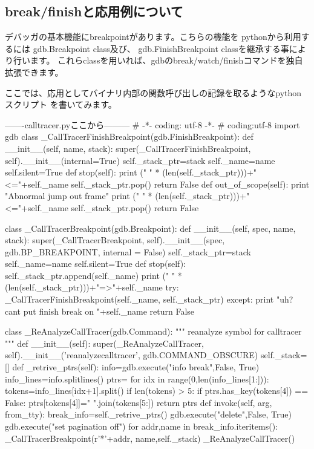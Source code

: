 \documentclass[mingoth,a4paper]{jsarticle}
\begin{document}
\subsection{break/finishと応用例について}

 デバッガの基本機能にbreakpointがあります。こちらの機能を
pythonから利用するには gdb.Breakpoint class及び、
gdb.FinishBreakpoint classを継承する事により行います。
これらclassを用いれば、gdbのbreak/watch/finishコマンドを独自拡張できます。

 ここでは、応用としてバイナリ内部の関数呼び出しの記録を取るようなpythonスクリプト
を書いてみます。

\begin{commandline}
-------calltracer.pyここから---------
# -*- coding: utf-8 -*-
# coding:utf-8
import gdb
class _CallTracerFinishBreakpoint(gdb.FinishBreakpoint):
	def __init__(self, name, stack):
		super(_CallTracerFinishBreakpoint, self).__init__(internal=True)
		self._stack_ptr=stack
		self._name=name
		self.silent=True
	def stop(self):
		print (" " * (len(self._stack_ptr)))+"<="+self._name
		self._stack_ptr.pop()
		return False
	def out_of_scope(self):
		print "Abnormal jump out frame"
		print (" " * (len(self._stack_ptr)))+"<="+self._name
		self._stack_ptr.pop()
		return False

class _CallTracerBreakpoint(gdb.Breakpoint):
	def __init__(self, spec, name, stack):
		super(_CallTracerBreakpoint, self).__init__(spec, 
							    gdb.BP_BREAKPOINT,
							    internal = False)
		self._stack_ptr=stack
		self._name=name
		self.silent=True
	def stop(self):
		self._stack_ptr.append(self._name)
		print (" " * (len(self._stack_ptr)))+"=>"+self._name
		try:
			_CallTracerFinishBreakpoint(self._name, self._stack_ptr)
		except:
			print "uh? cant put finish break on "+self._name
		return False

class _ReAnalyzeCallTracer(gdb.Command):
	""" reanalyze symbol for calltracer """
	def __init__(self):
		super(_ReAnalyzeCallTracer, self).__init__('reanalyzecalltracer',
							gdb.COMMAND_OBSCURE)
		self._stack=[]
	def _retrive_ptrs(self):
		info=gdb.execute("info break",False, True)
		info_lines=info.splitlines()
		ptrs={}
		for idx in range(0,len(info_lines[1:])):
			tokens=info_lines[idx+1].split()
			if len(tokens) > 5:
				if ptrs.has_key(tokens[4]) == False:
					ptrs[tokens[4]]=" ".join(tokens[5:])
		return ptrs
	def invoke(self, arg, from_tty):
		break_info=self._retrive_ptrs()
		gdb.execute("delete",False, True)
		gdb.execute("set pagination off")
		for addr,name in break_info.iteritems():
			_CallTracerBreakpoint(r'*'+addr,
					      name,self._stack)
_ReAnalyzeCallTracer()


\end{commandline}
\end{document}
